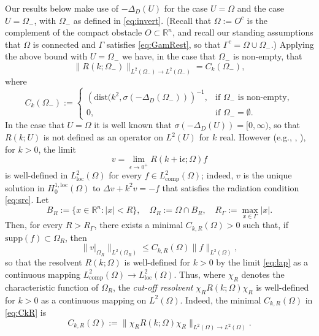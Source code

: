 \documentclass{birkjour}
\theoremstyle{definition}
\theoremstyle{remark}
\numberwithin{equation}{section}
\newcommand{\R}{\mathbb{R}}
\newcommand{\Hol}{H^{1,\mathrm{loc}}}
\newcommand{\Lloc}{L^{2}_{\mathrm{loc}}}
\newcommand{\Lcomp}{L^{2}_{\mathrm{comp}}}
\newcommand{\ri}{\mathrm{i}}
\newcommand{\supp}{\mathrm{supp}}
\newcommand{\spec}{\sigma}
\newcommand{\dist}{\mathrm{dist}}
\begin{document}
Our results below make use of $-\Delta_D(U)$ for the case $U=\Omega$ and the case $U=\Omega_-$, with $\Omega_-$  as defined in \eqref{eq:invert}.  (Recall that $\Omega := O^c$ is the complement of the compact obstacle $O\subset \R^n$, and recall our standing assumptions that $\Omega$ is connected and $\Gamma$ satisfies \eqref{eq:GamRest}, so that $\Gamma^c = \Omega \cup \Omega_-$.) Applying the above bound with $U=\Omega_-$ we have, in the case that $\Omega_-$ is non-empty, that
\begin{equation} \label{eq:resol}
\|R(k;\Omega_-)\|_{L^2(\Omega_-)\to L^2(\Omega_-)}=C_k(\Omega_-),
\end{equation}
where 
$$
C_k(\Omega_-) := \left\{\begin{array}{ll}
\left(\dist(k^2,\sigma(-\Delta_D(\Omega_-))\right)^{-1}, & \mbox{if  $\Omega_-$ is non-empty},\\
0, & \mbox{if $\Omega_-=\emptyset$}.\end{array}\right.
$$
In the case that $U=\Omega$ it is well known that $\spec(-\Delta_D(U))=[0,\infty)$, so that $R(k;U)$ is not defined as an operator on $L^2(U)$ for $k$ real. However (e.g., \cite[Lect.~4]{wilcox1975}, \cite{NR87}), for $k>0$, the limit \begin{equation} \label{eq:lap}
v=\lim_{\epsilon\to 0^+}R(k+\ri\epsilon;\Omega)f 
\end{equation}
is well-defined in $\Lloc(\Omega)$ for every $f\in \Lcomp(\Omega)$; indeed, $v$ is the unique solution in $\Hol_0(\Omega)$ to $\Delta v + k^2v = -f$ that satisfies the radiation condition \eqref{eq:src}. Let
$$
 B_R:=\{x\in \R^n:|x|<R\}, \quad \Omega_R:= \Omega \cap B_R,  \quad R_\Gamma := \max_{x\in \Gamma}|x|.
$$
Then, for every $R>R_\Gamma$, there exists a minimal $C_{k,R}(\Omega)>0$ such that, if $\supp(f)\subset \Omega_R$, then 
\begin{equation} \label{eq:CkR}
\|v|_{\Omega_R}\|_{L^2(\Omega_R)}\leq C_{k,R}(\Omega) \|f\|_{L^2(\Omega)},
\end{equation}
so that the resolvent $R(k;\Omega)$ is well-defined for $k>0$ by the limit \eqref{eq:lap} as a continuous mapping $\Lcomp(\Omega)\to \Lloc(\Omega)$. Thus, where $\chi_R$ denotes the characteristic function of $\Omega_R$, the {\em cut-off resolvent} $\chi_R R(k;\Omega)\chi_R$ is well-defined for $k>0$ as a continuous mapping on $L^2(\Omega)$. Indeed, the minimal $C_{k,R}(\Omega)$ in \eqref{eq:CkR} is
\begin{equation} \label{eq:CkR2}
C_{k,R}(\Omega) := \|\chi_R R(k;\Omega)\chi_R\|_{L^2(\Omega)\to L^2(\Omega)}.
\end{equation}
\end{document}
